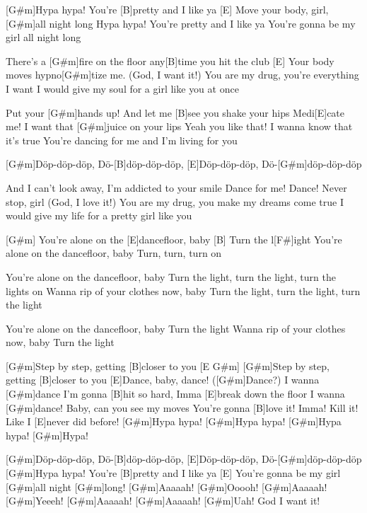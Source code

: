 

\begin{guitar}
	[G#m]Hypa hypa! You're [B]pretty and I like ya
	[E] Move your body, girl, [G#m]all night long
	Hypa hypa! You're pretty and I like ya
	You're gonna be my girl all night long
	
	There's a [G#m]fire on the floor any[B]time you hit the club
	[E] Your body moves hypno[G#m]tize me. (God, I want it!)
	You are my drug, you're everything I want
	I would give my soul for a girl like you at once
	
	Put your [G#m]hands up! And let me [B]see you shake your hips
	Medi[E]cate me! I want that [G#m]juice on your lips
	Yeah you like that! I wanna know that it's true
	You're dancing for me and I'm living for you
	
	[G#m]Döp-döp-döp, Dö-[B]döp-döp-döp, 
	[E]Döp-döp-döp, Dö-[G#m]döp-döp-döp
	
	 
	
	And I can't look away, I'm addicted to your smile
	Dance for me! Dance! Never stop, girl (God, I love it!)
	You are my drug, you make my dreams come true
	I would give my life for a pretty girl like you
	
	 
	
	[G#m] You're alone on the [E]dancefloor, baby
	[B] Turn the l[F#]ight
	You're alone on the dancefloor, baby
	Turn, turn, turn on
	
	You're alone on the dancefloor, baby
	Turn the light, turn the light, turn the lights on
	Wanna rip of your clothes now, baby
	Turn the light, turn the light, turn the light
	
	You're alone on the dancefloor, baby
	Turn the light
	Wanna rip of your clothes now, baby
	Turn the light
	
	[G#m]Step by step, getting [B]closer to you
	[E G#m]{}
	[G#m]Step by step, getting [B]closer to you
	[E]Dance, baby, dance! ([G#m]Dance?)
	I wanna [G#m]dance
	I'm gonna [B]hit so hard, Imma [E]break down the floor
	I wanna [G#m]dance! Baby, can you see my moves 
	You're gonna [B]love it! Imma! Kill it! Like I [E]never did before!
	[G#m]Hypa hypa!
	[G#m]Hypa hypa!
	[G#m]Hypa hypa!
	[G#m]Hypa!
	
	 
	
	[G#m]Döp-döp-döp, Dö-[B]döp-döp-döp, 
	[E]Döp-döp-döp, Dö-[G#m]döp-döp-döp
	[G#m]Hypa hypa! You're [B]pretty and I like ya
	[E] You're gonna be my girl [G#m]all night 
	[G#m]long! [G#m]Aaaaah!
	[G#m]Ooooh! [G#m]Aaaaah!
	[G#m]Yeeeh! [G#m]Aaaaah!
	[G#m]Aaaaah! [G#m]Uah! God I want it! 
\end{guitar}